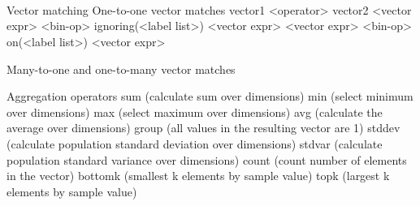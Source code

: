 \begin{bnf*}
	\\
	\\
	\\
	\\
	\\
	\\
\end{bnf*}
\begin{bnf*}
\\
\\
\end{bnf*}

Vector matching 
One-to-one vector matches 
vector1 <operator> vector2
<vector expr> <bin-op> ignoring(<label list>) <vector expr>
<vector expr> <bin-op> on(<label list>) <vector expr>

Many-to-one and one-to-many vector matches 



Aggregation operators 
sum (calculate sum over dimensions)
min (select minimum over dimensions)
max (select maximum over dimensions)
avg (calculate the average over dimensions)
group (all values in the resulting vector are 1)
stddev (calculate population standard deviation over dimensions)
stdvar (calculate population standard variance over dimensions)
count (count number of elements in the vector)
bottomk (smallest k elements by sample value)
topk (largest k elements by sample value)

